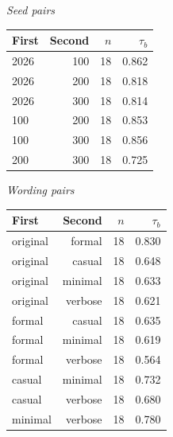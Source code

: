 \begin{minipage}[t]{\textwidth}
\centering
\footnotesize
\setlength{\tabcolsep}{3pt}
\begin{minipage}[t]{0.49\textwidth}
\vspace{0pt}
\centering
\emph{Seed pairs}\par\smallskip
\begin{tabular}{lrrr}
\toprule
First & Second & $n$ & $\tau_b$ \\
\midrule
2026 & 100 & 18 & 0.862 \\
2026 & 200 & 18 & 0.818 \\
2026 & 300 & 18 & 0.814 \\
100 & 200 & 18 & 0.853 \\
100 & 300 & 18 & 0.856 \\
200 & 300 & 18 & 0.725 \\
\bottomrule
\end{tabular}
\end{minipage}\hfill
\begin{minipage}[t]{0.49\textwidth}
\vspace{0pt}
\centering
\emph{Wording pairs}\par\smallskip
\begin{tabular}{lrrr}
\toprule
First & Second & $n$ & $\tau_b$ \\
\midrule
original & formal & 18 & 0.830 \\
original & casual & 18 & 0.648 \\
original & minimal & 18 & 0.633 \\
original & verbose & 18 & 0.621 \\
formal & casual & 18 & 0.635 \\
formal & minimal & 18 & 0.619 \\
formal & verbose & 18 & 0.564 \\
casual & minimal & 18 & 0.732 \\
casual & verbose & 18 & 0.680 \\
minimal & verbose & 18 & 0.780 \\
\bottomrule
\end{tabular}
\end{minipage}
\caption{All six seed-pair and ten wording-pair model-rank correlations. Each coefficient is descriptive Kendall $\tau_b$ over all 18 models. No resampling interval or repeated-generation reliability estimate was computed. These coefficients share models and are not independent replications.}
\label{tab:stability-pairs}
\end{minipage}
